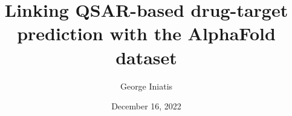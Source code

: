 \documentclass{mprop}
\begin{document}
\title{Linking QSAR-based drug-target prediction with the AlphaFold dataset}
\author{George Iniatis}
\date{December 16, 2022}
\maketitle

\tableofcontents
\newpage







\end{document}
